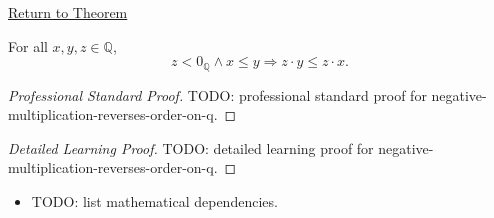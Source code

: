 \newpage
{}
\label{prf:negative-multiplication-reverses-order-on-q}

\begin{remark*}[Return]
\hyperref[cor:negative-multiplication-reverses-order-on-q]{Return to Theorem}
\end{remark*}

\begin{corollary*}
For all $x,y,z\in\mathbb{Q}$,
\[
z<0_{\mathbb{Q}}\land x\le y
\Longrightarrow
z\cdot y\le z\cdot x.
\]
\end{corollary*}

\begin{proof}[Professional Standard Proof]
\LRAProofBodyStart
TODO: professional standard proof for negative-multiplication-reverses-order-on-q.
\end{proof}

\begin{proof}[Detailed Learning Proof]
\LRAProofBodyStart
TODO: detailed learning proof for negative-multiplication-reverses-order-on-q.
\end{proof}

\begin{remark*}
\end{remark*}

\begin{dependencies}
\begin{itemize}
  \item TODO: list mathematical dependencies.
\end{itemize}
\end{dependencies}

\clearpage
